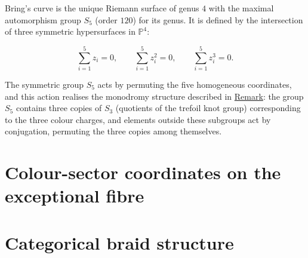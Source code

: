 \begin{remark}
  \label{rem:brings-curve}
Bring's curve is the unique Riemann surface of genus $4$ with the maximal
automorphism group $S_5$ (order $120$) for its genus.  It is defined by
the intersection of three symmetric hypersurfaces in $\mathbb{P}^4$:

\[
\sum_{i=1}^{5} z_i = 0,
  \qquad
  \sum_{i=1}^{5} z_i^2 = 0,
  \qquad
  \sum_{i=1}^{5} z_i^3 = 0.
\]

The symmetric group $S_5$ acts by permuting the five homogeneous coordinates,
and this action realises the monodromy structure described in
\hyperref[rem:chirality-trefoil]{Remark}: the group $S_5$ contains three copies of
$S_3$ (quotients of the trefoil knot group) corresponding to the three
colour charges, and elements outside these subgroups act by conjugation,
permuting the three copies among themselves.
\end{remark}

\section{Colour-sector coordinates on the exceptional fibre}
\label{sec:colour-sector-coords}

\section{Categorical braid structure}
\label{sec:descartes-braid}

